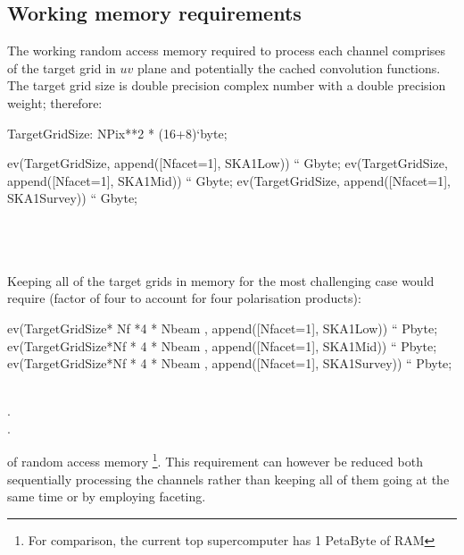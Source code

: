 \documentclass[useAMS,usenatbib,referee]{article}
\begin{document}
\subsection{Working memory requirements}

The working random access memory required to process each channel
comprises of the target grid in $uv$ plane and potentially the cached
convolution functions. The target grid size is double precision
complex number with a double precision weight; therefore:

\begin{maxima}[]
TargetGridSize: NPix**2 * (16+8)`byte;

ev(TargetGridSize, append([Nfacet=1], SKA1Low)) `` Gbyte;
ev(TargetGridSize, append([Nfacet=1], SKA1Mid)) `` Gbyte;
ev(TargetGridSize, append([Nfacet=1], SKA1Survey)) `` Gbyte;
\maximaoutput*
{}\; \\
\; \\
\; \\
\; \\
\end{maxima}

Keeping all of the target grids in memory for the most challenging
case would require (factor of four to account for four polarisation
products):
\begin{maxima}[]
ev(TargetGridSize* Nf *4 * Nbeam  , append([Nfacet=1], SKA1Low)) `` Pbyte;
ev(TargetGridSize*Nf * 4 * Nbeam , append([Nfacet=1], SKA1Mid)) `` Pbyte;
ev(TargetGridSize*Nf * 4 * Nbeam , append([Nfacet=1], SKA1Survey)) `` Pbyte;

\maximaoutput*
{}\; \\
.\; \\
.\; \\
\end{maxima}
of random access memory \footnote{For comparison, the current top supercomputer has 1
  PetaByte of RAM}. This requirement can however be reduced both
sequentially processing the channels rather than keeping all of them
going at the same time or by employing faceting.
\end{document}
